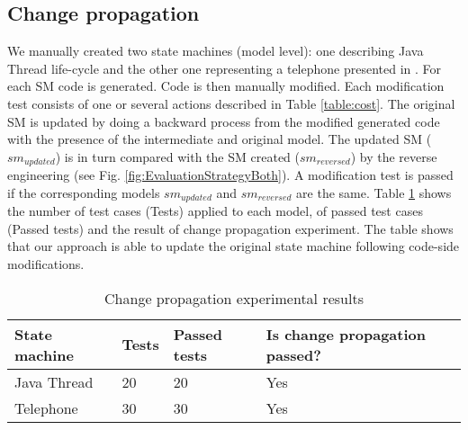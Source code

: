 \subsection{Change propagation} 
We manually created two state machines (model level): one describing Java Thread life-cycle \cite{_java_thread} and the other one representing a telephone presented in \cite{Specification2007}. For each SM code is generated. Code is then manually modified. Each modification test consists of one or several actions described in Table \ref{table:cost}. The original SM is updated by doing a backward process from the modified generated code with the presence of the intermediate and original model. The updated SM ($sm_{updated}$) is in turn compared with the SM created ($sm_{reversed}$) by the reverse engineering (see Fig. \ref{fig:EvaluationStrategyBoth}). A modification test is passed if the corresponding models $sm_{updated}$ and $sm_{reversed}$ are the same. Table \ref{table:change-propa} shows the number of test cases (Tests) applied to each model, of passed test cases (Passed tests) and the result of change propagation experiment. The table shows that our approach is able to update the original state machine following code-side modifications. 

\begin{table}
\centering
\caption{Change propagation experimental results}
\label{table:change-propa}
\begin{tabular}{|l|l|l|p{3.4cm}|}
\hline
\rowcolor{Gray}
State machine & Tests & Passed tests & Is change propagation passed? \\ \hline
Java Thread       &    20     &    20      &     Yes             \\ \hline
Telephone       &   30      &     30     &      Yes       \\ \hline
\end{tabular}
\end{table}